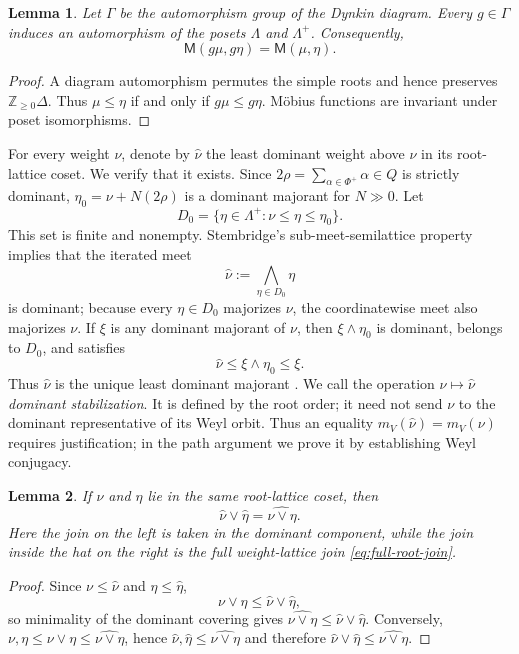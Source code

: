 \documentclass[11pt]{article}
\newtheorem{lemma}[lemma]{Lemma}
\theoremstyle{definition}
\theoremstyle{remark}
\newcommand{\Raiz}{\Phi}
\newcommand{\RaizSimp}{\Delta}
\newcommand{\RaizReti}{Q}
\newcommand{\Pesos}{\Lambda}
\newcommand{\Mu}{\mathsf{M}}
\newcommand{\Z}{\mathbb Z}
\begin{document}
\begin{lemma}\label{lem:dynkin-poset}
Let $\Gamma$ be the automorphism group of the Dynkin diagram.  Every
$g\in\Gamma$ induces an automorphism of the posets $\Pesos$ and $\Pesos^+$.
Consequently,
\[
    \Mu(g\mu,g\eta)=\Mu(\mu,\eta).
\]
\end{lemma}

\begin{proof}
A diagram automorphism permutes the simple roots and hence preserves
$\Z_{\ge0}\RaizSimp$.  Thus
$\mu\le\eta$ if and only if $g\mu\le g\eta$.  M\"obius functions are invariant
under poset isomorphisms.
\end{proof}

For every weight $\nu$, denote by $\widehat\nu$ the least dominant weight
above $\nu$ in its root-lattice coset.  We verify that it exists.  Since
$2\rho=\sum_{\alpha\in\Raiz^+}\alpha\in\RaizReti$ is strictly dominant,
$\eta_0=\nu+N(2\rho)$ is a dominant majorant for $N\gg0$.  Let
\[
 D_0=\{\eta\in\Pesos^+:\nu\le\eta\le\eta_0\}.
\]
This set is finite and nonempty.  Stembridge's sub-meet-semilattice property
implies that the iterated meet
\[
 \widehat\nu:=\bigwedge_{\eta\in D_0}\eta
\]
is dominant; because every $\eta\in D_0$ majorizes $\nu$, the coordinatewise
meet also majorizes $\nu$.  If $\xi$ is any dominant majorant of $\nu$, then
$\xi\wedge\eta_0$ is dominant, belongs to $D_0$, and satisfies
\[
 \widehat\nu\le \xi\wedge\eta_0\le\xi.
\]
Thus $\widehat\nu$ is the unique least dominant majorant \cite{Stembridge}.
We call the operation $\nu\mapsto\widehat\nu$ \emph{dominant stabilization}.
It is defined by the root order; it need not send $\nu$ to the dominant
representative of its Weyl orbit.  Thus an equality
$m_V(\widehat\nu)=m_V(\nu)$ requires justification; in the path argument
we prove it by establishing Weyl conjugacy.

\begin{lemma}\label{lem:dominant-covering-join}
If $\nu$ and $\eta$ lie in the same root-lattice coset, then
\[
    \widehat\nu\vee\widehat\eta
       =\widehat{\nu\vee\eta}.
\]
Here the join on the left is taken in the dominant component, while the join
inside the hat on the right is the full weight-lattice join
\eqref{eq:full-root-join}.
\end{lemma}

\begin{proof}
Since $\nu\le\widehat\nu$ and $\eta\le\widehat\eta$,
\[
   \nu\vee\eta\le \widehat\nu\vee\widehat\eta,
\]
so minimality of the dominant covering gives
$\widehat{\nu\vee\eta}\le\widehat\nu\vee\widehat\eta$.
Conversely, $\nu,\eta\le\nu\vee\eta\le\widehat{\nu\vee\eta}$, hence
$\widehat\nu,\widehat\eta\le\widehat{\nu\vee\eta}$ and therefore
$\widehat\nu\vee\widehat\eta\le\widehat{\nu\vee\eta}$.
\end{proof}
\end{document}

